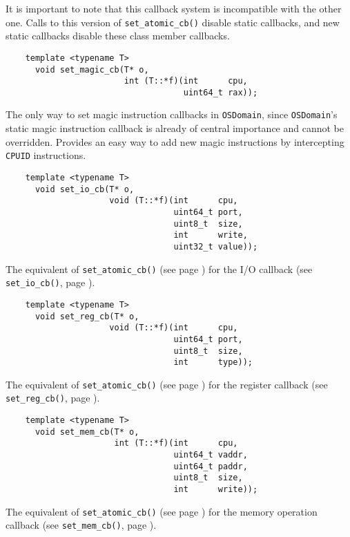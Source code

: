 \documentclass[letterpaper, 10pt]{book}
\begin{document}
It is important to note that this callback system is incompatible with the
other one. Calls to this version of \texttt{set\_atomic\_cb()} disable static
callbacks, and new static callbacks disable these class member callbacks.

\label{tf:set_magic_cb} \begin{verbatim}
    template <typename T>
      void set_magic_cb(T* o,
                        int (T::*f)(int      cpu, 
                                    uint64_t rax));
\end{verbatim}
The only way to set magic instruction callbacks in \texttt{OSDomain}, since
\texttt{OSDomain}'s static magic instruction callback is already of central
importance and cannot be overridden. Provides an easy way to add new magic
instructions by intercepting \texttt{CPUID} instructions.

\label{tf:set_io_cb} \begin{verbatim}
    template <typename T>
      void set_io_cb(T* o,
                     void (T::*f)(int      cpu, 
                                  uint64_t port,
                                  uint8_t  size, 
                                  int      write,
                                  uint32_t value));
\end{verbatim}
The equivalent of \texttt{set\_atomic\_cb()} (see page
\pageref{tf:set_atomic_cb}) for the I/O callback (see \texttt{set\_io\_cb()}, 
page \pageref{func:set_io_cb}).

\label{tf:set_reg_cb} \begin{verbatim} 
    template <typename T>
      void set_reg_cb(T* o,
                     void (T::*f)(int      cpu,
                                  uint64_t port,
                                  uint8_t  size,
                                  int      type));
\end{verbatim}
The equivalent of \texttt{set\_atomic\_cb()} (see page
\pageref{tf:set_atomic_cb}) for the register callback (see 
\texttt{set\_reg\_cb()}, page \pageref{func:set_reg_cb}).


\label{tf:set_mem_cb} \begin{verbatim}
    template <typename T>
      void set_mem_cb(T* o,
                      int (T::*f)(int      cpu,
                                  uint64_t vaddr, 
                                  uint64_t paddr,
                                  uint8_t  size,
                                  int      write));
\end{verbatim}
The equivalent of \texttt{set\_atomic\_cb()} (see page 
\pageref{tf:set_atomic_cb}) for the memory operation callback (see 
\texttt{set\_mem\_cb()}, page \pageref{func:set_mem_cb}).
\end{document}
